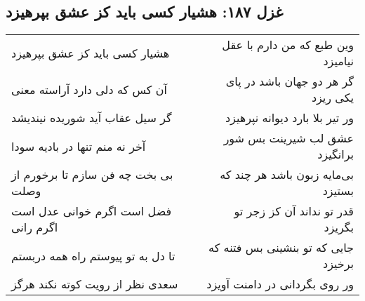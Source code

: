 \begin{center}
\section*{غزل ۱۸۷: هشیار کسی باید کز عشق بپرهیزد}
\label{sec:187}
\begin{longtable}{l p{0.5cm} r}
هشیار کسی باید کز عشق بپرهیزد
&&
وین طبع که من دارم با عقل نیامیزد
\\
آن کس که دلی دارد آراسته معنی
&&
گر هر دو جهان باشد در پای یکی ریزد
\\
گر سیل عقاب آید شوریده نیندیشد
&&
ور تیر بلا بارد دیوانه نپرهیزد
\\
آخر نه منم تنها در بادیه سودا
&&
عشق لب شیرینت بس شور برانگیزد
\\
بی بخت چه فن سازم تا برخورم از وصلت
&&
بی‌مایه زبون باشد هر چند که بستیزد
\\
فضل است اگرم خوانی عدل است اگرم رانی
&&
قدر تو نداند آن کز زجر تو بگریزد
\\
تا دل به تو پیوستم راه همه دربستم
&&
جایی که تو بنشینی بس فتنه که برخیزد
\\
سعدی نظر از رویت کوته نکند هرگز
&&
ور روی بگردانی در دامنت آویزد
\\
\end{longtable}
\end{center}

